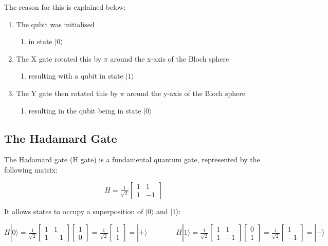 The reason for this is explained below:
\begin{enumerate}
    \item The qubit was initialised 
    \begin{enumerate}
        \item in state $|0\rangle$
    \end{enumerate}
    \item The X gate rotated this by $\pi$ around the x-axis of the Bloch sphere
    \begin{enumerate}
        \item resulting with a qubit in state $|1\rangle$
    \end{enumerate}
    \item The Y gate then rotated this by $\pi$ around the y-axis of the Bloch sphere
    \begin{enumerate}
        \item resulting in the qubit being in state $|0\rangle$
    \end{enumerate} 
\end{enumerate}

\subsection{The Hadamard Gate}
The Hadamard gate (H gate) is a fundamental quantum gate, represented by the following matrix:

$$ H = \tfrac{1}{\sqrt{2}}\begin{bmatrix} 1 & 1 \\ 1 & -1 \end{bmatrix} $$

It allows states to occupy a superposition of $|0\rangle$ and $|1\rangle$:

$$ H|0\rangle = \tfrac{1}{\sqrt{2}}\begin{bmatrix} 1 & 1 \\ 1 & -1 \end{bmatrix}\begin{bmatrix} 1 \\ 0 \end{bmatrix} = \tfrac{1}{\sqrt{2}} \begin{bmatrix} 1 \\ 1 \end{bmatrix}= |+\rangle 
\quad \quad \quad \quad 
H|1\rangle = \tfrac{1}{\sqrt{2}}\begin{bmatrix} 1 & 1 \\ 1 & -1 \end{bmatrix}\begin{bmatrix} 0 \\ 1 \end{bmatrix} = \tfrac{1}{\sqrt{2}} \begin{bmatrix} 1 \\ -1 \end{bmatrix}= |-\rangle $$

